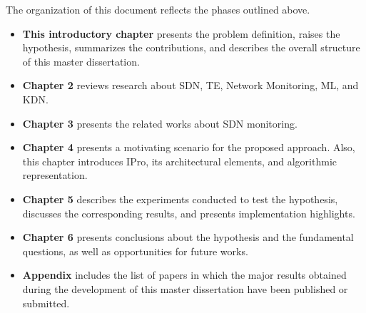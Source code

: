 The organization of this document reflects the phases outlined above.
\begin{itemize}
    \item \textbf{This introductory chapter} presents the problem definition, raises the hypothesis, summarizes the contributions, and describes the overall structure of this master dissertation.
    
    \item \textbf{Chapter 2} reviews research about SDN, TE, Network Monitoring, ML, and KDN.
    
    \item \textbf{Chapter 3} presents the related works about SDN monitoring.
    
    \item \textbf{Chapter 4} presents a motivating scenario for the proposed approach. Also, this chapter introduces IPro, its architectural elements, and algorithmic representation.
    
    \item \textbf{Chapter 5} describes the experiments conducted to test the hypothesis, discusses the corresponding results, and presents implementation highlights.
    
    \item \textbf{Chapter 6} presents conclusions about the hypothesis and the fundamental questions, as well as opportunities for future works. 
    
    \item \textbf{Appendix} includes the list of papers in which the major results obtained during the development of this master dissertation have been published or submitted.
    
\end{itemize}